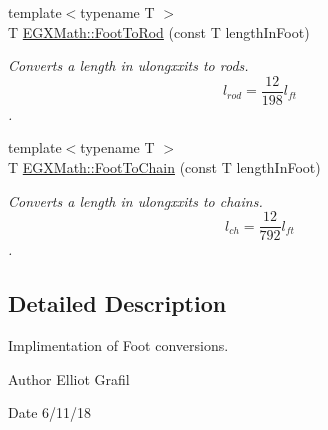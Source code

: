 \begin{DoxyCompactItemize}
{\footnotesize template$<$typename T $>$ }\\T \mbox{\hyperlink{group___e_g_x_math-_conversions-_length_conversions-_imperial-_foot-_surveyors_gace4054ff26544ac7fa6717cec4ce9491}{E\+G\+X\+Math\+::\+Foot\+To\+Rod}} (const T length\+In\+Foot)
\begin{DoxyCompactList}\small\item\em Converts a length in ulongxxits to rods. \[ l_{rod}= \frac{12}{198} l_{ft} \]. \end{DoxyCompactList}\item 
{\footnotesize template$<$typename T $>$ }\\T \mbox{\hyperlink{group___e_g_x_math-_conversions-_length_conversions-_imperial-_foot-_surveyors_ga518f4539e56a49bfc866ec22139752e1}{E\+G\+X\+Math\+::\+Foot\+To\+Chain}} (const T length\+In\+Foot)
\begin{DoxyCompactList}\small\item\em Converts a length in ulongxxits to chains. \[ l_{ch}= \frac{12}{792} l_{ft} \]. \end{DoxyCompactList}\end{DoxyCompactItemize}


\subsection{Detailed Description}
Implimentation of Foot conversions. 

\begin{DoxyAuthor}{Author}
Elliot Grafil 
\end{DoxyAuthor}
\begin{DoxyDate}{Date}
6/11/18 
\end{DoxyDate}
